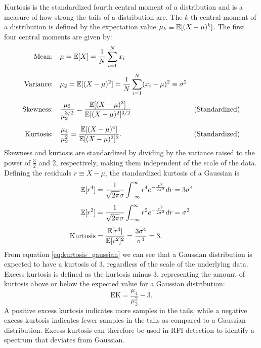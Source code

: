 Kurtosis is the standardized fourth central moment of a distribution and is a measure of how strong the tails of a distribution are. The $k$-th central moment of a distribution is defined by the expectation value $\mu_k \equiv \mathbb{E}[(X-\mu)^k]$. The first four central moments are given by:
\begin{align}
    \text{Mean:}     \quad & \mu = \mathbb{E}[X] = \frac{1}{N}\sum_{i=1}^{N} x_i
        && \\[4pt]
    \text{Variance:} \quad & \mu_2 = \mathbb{E}[(X-\mu)^2] = \frac{1}{N}\sum_{i=1}^{N} (x_i-\mu)^2 \equiv \sigma^2
        && \\[4pt]
    \text{Skewness:} \quad & \frac{\mu_3}{\mu_2^{3/2}}
        = \frac{\mathbb{E}[(X-\mu)^3]}{\mathbb{E}[(X-\mu)^2]^{3/2}}
        && (\text{Standardized})\\[4pt]
    \text{Kurtosis:} \quad & \frac{\mu_4}{\mu_2^{2}}
        = \frac{\mathbb{E}[(X-\mu)^4]}{\mathbb{E}[(X-\mu)^2]^{2}}.
        && (\text{Standardized})
\end{align}
Skewness and kurtosis are standardized by dividing by the variance raised to the power of $\tfrac{3}{2}$ and 2, respectively, making them independent of the scale of the data.\\
Defining the residuals \mbox{$r \equiv X - \mu$}, the standardized kurtosis of a Gaussian is
\begin{align}
    \mathbb{E}[r^4] &= \frac{1}{\sqrt{2\pi}\sigma} \int_{-\infty}^{\infty} r^4 e^{-\frac{r^2}{2\sigma^2}} dr = 3\sigma^4 \\[4pt]
    \mathbb{E}[r^2] &= \frac{1}{\sqrt{2\pi}\sigma} \int_{-\infty}^{\infty} r^2 e^{-\frac{r^2}{2\sigma^2}} dr = \sigma^2 \\[4pt]
    \text{Kurtosis} &= \frac{\mathbb{E}[r^4]}{\mathbb{E}[r^2]^2} = \frac{3\sigma^4}{\sigma^4} = 3.
    \label{eq:kurtosis_gaussian}
\end{align}
From equation \ref{eq:kurtosis_gaussian} we can see that a Gaussian distribution is expected to have a kurtosis of 3, regardless of the scale of the underlying data. Excess kurtosis is defined as the kurtosis minus 3, representing the amount of kurtosis above or below the expected value for a Gaussian distribution: 
\begin{equation}
    \text{EK} = \dfrac{\mu_4}{\mu^2_2} - 3.
    \label{eq:excess_kurtosis_biased}
\end{equation}
A positive excess kurtosis indicates more samples in the tails, while a negative excess kurtosis indicates fewer samples in the tails as compared to a Gaussian distribution. Excess kurtosis can therefore be used in RFI detection to identify a spectrum that deviates from Gaussian.\\

